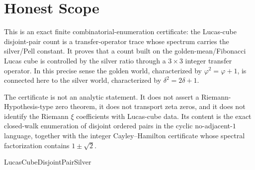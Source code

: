 \section{Honest Scope}
\label{sec:lucas-cube-disjoint-pair-silver-honest-scope}

This is an exact finite combinatorial-enumeration certificate: the Lucas-cube disjoint-pair count is a transfer-operator trace whose spectrum carries the silver/Pell constant. It proves that a count built on the golden-mean/Fibonacci Lucas cube is controlled by the silver ratio through a $3\times3$ integer transfer operator. In this precise sense the golden world, characterized by $\varphi^2=\varphi+1$, is connected here to the silver world, characterized by $\delta^2=2\delta+1$.

The certificate is not an analytic statement. It does not assert a Riemann-Hypothesis-type zero theorem, it does not transport zeta zeros, and it does not identify the Riemann $\xi$ coefficients with Lucas-cube data. Its content is the exact closed-walk enumeration of disjoint ordered pairs in the cyclic no-adjacent-$1$ language, together with the integer Cayley--Hamilton certificate whose spectral factorization contains $1\pm\sqrt2$.



\begin{closurestatus}{LucasCubeDisjointPairSilver}
  \theoryclosure{\scopedClosure}
  \formalstatus{\theoremCheckedV}
\end{closurestatus}
